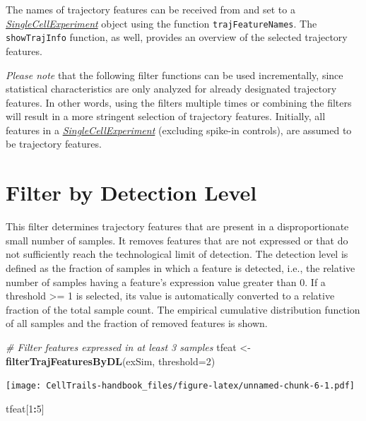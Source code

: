 \documentclass[]{book}
\newenvironment{Shaded}{\begin{snugshade}}{\end{snugshade}}
\newcommand{\KeywordTok}[1]{\textcolor[rgb]{0.13,0.29,0.53}{\textbf{#1}}}
\newcommand{\DataTypeTok}[1]{\textcolor[rgb]{0.13,0.29,0.53}{#1}}
\newcommand{\DecValTok}[1]{\textcolor[rgb]{0.00,0.00,0.81}{#1}}
\newcommand{\StringTok}[1]{\textcolor[rgb]{0.31,0.60,0.02}{#1}}
\newcommand{\CommentTok}[1]{\textcolor[rgb]{0.56,0.35,0.01}{\textit{#1}}}
\newcommand{\OperatorTok}[1]{\textcolor[rgb]{0.81,0.36,0.00}{\textbf{#1}}}
\newcommand{\NormalTok}[1]{#1}
\theoremstyle{definition}
\theoremstyle{definition}
\theoremstyle{definition}
\theoremstyle{remark}
\begin{document}
The names of trajectory features can be received from and set to a
\emph{\href{http://bioconductor.org/packages/SingleCellExperiment}{SingleCellExperiment}}
object using the function \texttt{trajFeatureNames}. The
\texttt{showTrajInfo} function, as well, provides an overview of the
selected trajectory features.

\emph{Please note} that the following filter functions can be used
incrementally, since statistical characteristics are only analyzed for
already designated trajectory features. In other words, using the
filters multiple times or combining the filters will result in a more
stringent selection of trajectory features. Initially, all features in a
\emph{\href{http://bioconductor.org/packages/SingleCellExperiment}{SingleCellExperiment}}
(excluding spike-in controls), are assumed to be trajectory features.

\section{Filter by Detection Level}\label{filter-by-detection-level}

This filter determines trajectory features that are present in a
disproportionate small number of samples. It removes features that are
not expressed or that do not sufficiently reach the technological limit
of detection. The detection level is defined as the fraction of samples
in which a feature is detected, i.e., the relative number of samples
having a feature's expression value greater than 0. If a threshold
\textgreater{}= 1 is selected, its value is automatically converted to a
relative fraction of the total sample count. The empirical cumulative
distribution function of all samples and the fraction of removed
features is shown.

\begin{Shaded}
\begin{Highlighting}[]
\CommentTok{# Filter features expressed in at least 3 samples}
\NormalTok{tfeat <-}\StringTok{ }\KeywordTok{filterTrajFeaturesByDL}\NormalTok{(exSim, }\DataTypeTok{threshold=}\DecValTok{2}\NormalTok{)}
\end{Highlighting}
\end{Shaded}

\texttt{[image: CellTrails-handbook\_files/figure-latex/unnamed-chunk-6-1.pdf]}

\begin{Shaded}
\begin{Highlighting}[]
\NormalTok{tfeat[}\DecValTok{1}\OperatorTok{:}\DecValTok{5}\NormalTok{]}
\end{Highlighting}
\end{Shaded}
\end{document}

